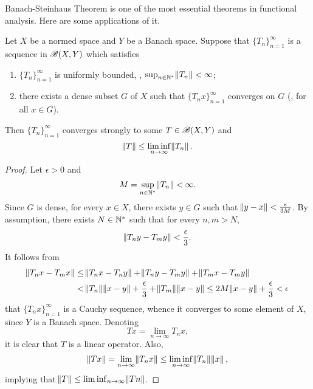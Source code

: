 Banach-Steinhaus Theorem is one of the most essential theorems in functional 
analysis. 
Here are some applications of it. 

\begin{thm}
\label{thm:bounded_linear_operators:strong_convergence_uniformly_bounded_dense}
Let $X$ be a normed space and $Y$ be a Banach space. 
Suppose that $\{ T_n \}_{n=1}^{\infty}$ is a sequence in $\mathscr{B}(X, Y)$ which 
satisfies 
\begin{enumerate}
    \item $\{ T_n \}_{n=1}^{\infty}$ is uniformly bounded, \ie, 
    $\sup_{n \in \mathbb{N}^\ast} \norm{T_n} < \infty$; 
    \item there exists a dense subset $G$ of $X$ such that $\{ T_n x \}
    _{n=1}^{\infty}$ converges on $G$ (\ie, for all $x \in G$). 
\end{enumerate}
Then $\{ T_n \}_{n=1}^{\infty}$ converges strongly to some $T \in 
\mathscr{B}(X, Y)$ and 
\begin{equation*}
    \norm{T} \le \liminf_{n \to \infty} \norm{T_n}. 
\end{equation*}
\end{thm}
\begin{proof}
Let $\epsilon > 0$ and 
\begin{equation*}
    M = \sup_{n \in \mathbb{N}^\ast} \norm{T_n} < \infty. 
\end{equation*}
Since $G$ is dense, for every $x \in X$, there exists $y \in G$ such that 
$\norm{y - x} < \frac{\epsilon}{3M}$. 
By assumption, there exists $N \in \mathbb{N}^\ast$ such that for every $n, m > N$, 
\begin{equation*}
    \norm{T_n y - T_m y} < \frac{\epsilon}{3}.
\end{equation*}
It follows from 
\begin{equation*}
    \begin{aligned}
        \norm{T_n x - T_m x} &\le \norm{T_n x - T_n y} 
            + \norm{T_n y - T_m y} + \norm{T_m x - T_m y} \\
        &< \norm{T_n} \norm{x - y} + \frac{\epsilon}{3} 
            + \norm{T_m} \norm{x - y} 
        \le 2 M \norm{x - y} + \frac{\epsilon}{3} < \epsilon 
    \end{aligned}
\end{equation*}
that $\{ T_n x \}_{n=1}^{\infty}$ is a Cauchy sequence, whence it converges 
to some element of $X$, since $Y$ is a Banach space. 
Denoting 
\begin{equation*}
    Tx = \lim_{n \to \infty} T_n x, 
\end{equation*}
it is clear that $T$ is a linear operator. 
Also, 
\begin{equation*}
    \norm{Tx} = \lim_{n \to \infty} \norm{T_n x} 
    \le \liminf_{n \to \infty} \norm{T_n} \norm{x}, 
\end{equation*}
implying that $\norm{T} \le \liminf_{n \to \infty} \norm{Tn}$. 
\end{proof}

